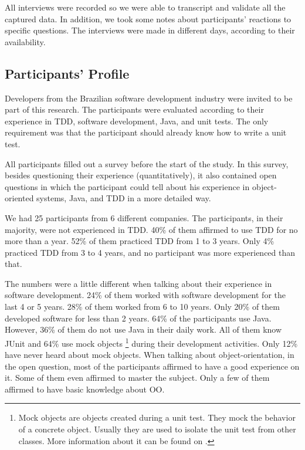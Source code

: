 \documentclass[times]{elsarticle}
\begin{document}
All interviews were recorded so we were able to transcript and validate all
the captured data. In addition, we took some notes about participants' reactions
to specific questions. The interviews were made in different days,
according to their availability.

\subsection{Participants' Profile}
\label{sec:planejamento-participantes}

Developers from the Brazilian software development industry were invited to be part
of this research. The participants were evaluated according to their experience in TDD,
software development, Java, and unit tests. The only requirement was that the participant
should already know how to write a unit test.

All participants filled out a survey before the start of the study. In this survey,
besides questioning their experience (quantitatively), it also contained open questions in which
the participant could tell about his experience in object-oriented systems, Java, and
TDD in a more detailed way.

We had 25 participants from 6 different companies. The participants, in their majority,
were not experienced in TDD. 40\% of them affirmed to use TDD for no more than a year.
52\% of them practiced TDD from 1 to 3 years. Only 4\% practiced TDD from 3 to 4
years, and no participant was more experienced than that.

The numbers were a little different when talking about their experience in software
development. 24\% of them worked with software development for the last 4 or 5 years.
28\% of them worked from 6 to 10 years. Only 20\% of them developed software for less
than 2 years. 64\% of the participants use Java. However, 36\% of them do not use
Java in their daily work. All of them know JUnit and 64\% use mock objects 
\footnote{Mock objects are objects created during a unit test. They mock the behavior 
of a concrete object. Usually they are used to isolate the unit test from other classes. 
More information about it can be found on \cite{mocks}.}
during their development activities.
Only 12\% have never heard about mock objects. When talking about object-orientation,
in the open question, most of the participants affirmed to have a good experience
on it. Some of them even affirmed to master the subject. Only a few of them affirmed
to have basic knowledge about OO.
\end{document}
